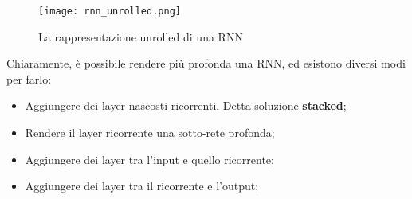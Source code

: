 \begin{figure}[H]
	\centering
	\texttt{[image: rnn\_unrolled.png]}
	\caption{La rappresentazione unrolled di una RNN}
	\label{fig:rnn_unrolled}
\end{figure}
Chiaramente, è possibile rendere più profonda una RNN, ed esistono diversi modi per farlo:
\begin{itemize}
	\item Aggiungere dei layer nascosti ricorrenti. Detta soluzione \textbf{stacked};
	\item Rendere il layer ricorrente una sotto-rete profonda;
	\item Aggiungere dei layer tra l'input e quello ricorrente;
	\item Aggiungere dei layer tra il ricorrente e l'output;
\end{itemize}

